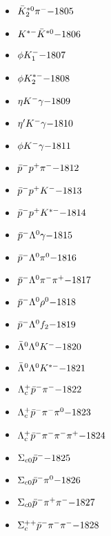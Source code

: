 \begin{multicols}{3}
\begin{itemize}
 \item $ \bar{K}_{2}^{*0} \pi^{-} \hfill{-1805}$
 \item $ K^{*-} \bar{K}^{*0} \hfill{-1806}$
 \item $ \phi K_{1}^{-} \hfill{-1807}$
 \item $ \phi K_{2}^{*-} \hfill{-1808}$
 \item $ \eta K^{-} \gamma \hfill{-1809}$
 \item $ {\eta^{\prime}} K^{-} \gamma \hfill{-1810}$
 \item $ \phi K^{-} \gamma \hfill{-1811}$
 \item $ \bar{p}^{-} p^{+} \pi^{-} \hfill{-1812}$
 \item $ \bar{p}^{-} p^{+} K^{-} \hfill{-1813}$
 \item $ \bar{p}^{-} p^{+} K^{*-} \hfill{-1814}$
 \item $ \bar{p}^{-} \Lambda^{0} \gamma \hfill{-1815}$
 \item $ \bar{p}^{-} \Lambda^{0} \pi^{0} \hfill{-1816}$
 \item $ \bar{p}^{-} \Lambda^{0} \pi^{-} \pi^{+} \hfill{-1817}$
 \item $ \bar{p}^{-} \Lambda^{0} \rho^{0} \hfill{-1818}$
 \item $ \bar{p}^{-} \Lambda^{0} f_{2} \hfill{-1819}$
 \item $ \bar{\Lambda}^{0} \Lambda^{0} K^{-} \hfill{-1820}$
 \item $ \bar{\Lambda}^{0} \Lambda^{0} K^{*-} \hfill{-1821}$
 \item $ \Lambda_{c}^{+} \bar{p}^{-} \pi^{-} \hfill{-1822}$
 \item $ \Lambda_{c}^{+} \bar{p}^{-} \pi^{-} \pi^{0} \hfill{-1823}$
 \item $ \Lambda_{c}^{+} \bar{p}^{-} \pi^{-} \pi^{-} \pi^{+} \hfill{-1824}$
 \item $ \Sigma_{c0} \bar{p}^{-} \hfill{-1825}$
 \item $ \Sigma_{c0} \bar{p}^{-} \pi^{0} \hfill{-1826}$
 \item $ \Sigma_{c0} \bar{p}^{-} \pi^{+} \pi^{-} \hfill{-1827}$
 \item $ \Sigma_{c}^{++} \bar{p}^{-} \pi^{-} \pi^{-} \hfill{-1828}$
 \end{itemize} 
 \end{multicols} 
